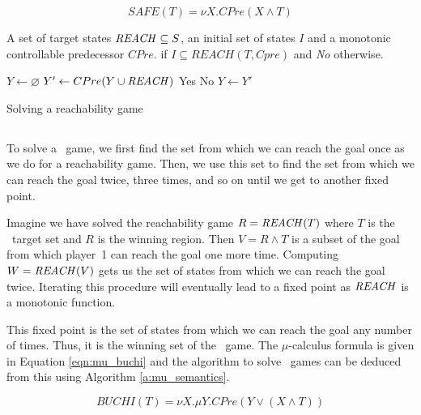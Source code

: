 \begin{equation}
\mathit{SAFE}(T) = \nu X. CPre(X \wedge T)
\label{eqn:mu_safe}
\end{equation}

\begin{algorithm}
\begin{algorithmic}

\Require A set of target states $\mathit{REACH} \subseteq S$, an initial set of states $I$ and a monotonic controllable predecessor $CPre$.
 if $I \subseteq REACH(T, Cpre)$ and {\it No} otherwise.

    \State $Y \gets \varnothing$
    \Loop
        \State $Y' \gets CPre(Y \cup \mathit{REACH})$
                \State\Return Yes
            \Else
                \State\Return No
            \EndIf
        \EndIf
        \State $Y \gets Y'$
    \EndLoop
\EndFunction

\end{algorithmic}
\caption{Solving a reachability game}
\label{a:reach}
\end{algorithm}

\subsection{\buchi}

To solve a \buchi\ game, we first find the set from which we can reach the goal once as we do for a reachability game. Then, we use this set to find the set from which we can reach the goal twice, three times, and so on until we get to another fixed point. 

Imagine we have solved the reachability game $R = \mathit{REACH}(T)$ where $T$ is the \buchi\ target set and $R$ is the winning region. Then $V = R \wedge T$ is a subset of the goal from which player~1 can reach the goal one more time. Computing $W = \mathit{REACH}(V)$ gets us the set of states from which we can reach the goal twice. Iterating this procedure will eventually lead to a fixed point as $\mathit{REACH}$ is a monotonic function.

This fixed point is the set of states from which we can reach the goal any number of times. Thus, it is the winning set of the \buchi\ game. The $\mu$-calculus formula is given in Equation \ref{eqn:mu_buchi} and the algorithm to solve \buchi\ games can be deduced from this using Algorithm \ref{a:mu_semantics}.

\begin{equation}
    \mathit{BUCHI}(T) = \nu X. \mu Y. CPre(Y \vee (X \wedge T))
\label{eqn:mu_buchi}
\end{equation}

